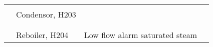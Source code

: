 \begin{table}[h]
\begin{tabularx}{\linewidth}{@{}lp{3cm}XX@{}}
     &                           &                                                                                                                                                               &                                                                                                                                                                                                                                                         \\ \cmidrule(l){2-4} 
     & Condensor, H203           &                                                                                                                                                               &                                                                                                                                                                                                                                                         \\ \cmidrule(l){3-4} 
     &                           &                                                                                                                                                               &                                                                                                                                                                                                                                                         \\ \cmidrule(l){3-4} 
     &                           &                                                                                                                                                               &                                                                                                                                                                                                                                                         \\ \cmidrule(l){2-4} 
     & Reboiler, H204            & Low flow alarm saturated steam                                                                                                                                &                                                                                                                                                                                                                                                         \\ \bottomrule
\end{tabularx}%
\end{table}
